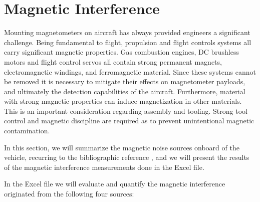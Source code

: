 \documentclass[english,fira]{ist-report}
\begin{document}
\chapter{Magnetic Interference} 
Mounting magnetometers on aircraft has always provided engineers a significant challenge. Being fundamental to flight, propulsion and flight controls systems all carry significant magnetic properties. Gas combustion engines, DC brushless motors and flight control servos all contain strong permanent magnets, electromagnetic windings, and ferromagnetic material. Since these systems cannot be removed it is necessary to mitigate their effects on magnetometer payloads, and ultimately the detection capabilities of the aircraft. Furthermore, material with strong magnetic properties can induce magnetization in other materials. This is an important consideration regarding assembly and tooling. Strong tool control and magnetic discipline are required as to prevent unintentional magnetic contamination. \par
In this section, we will summarize the magnetic noise sources onboard of the vehicle, recurring to the bibliographic reference \cite{mag_thesis}, and we will present the results of the magnetic interference measurements done in the Excel file.  \par
In the Excel file we will evaluate and quantify the magnetic interference originated from the following four sources:\par
\end{document}

